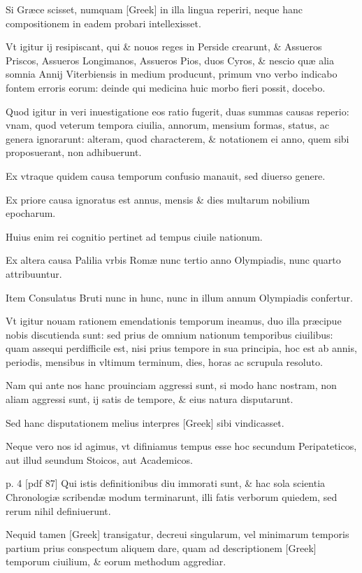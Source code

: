 Si Græce scisset, numquam \textgreek{[Greek]} in illa
lingua reperiri, neque hanc compositionem in eadem probari intellexisset.

Vt igitur ij resipiscant, qui \& nouos reges in Perside crearunt,
\& Assueros Priscos, Assueros Longimanos, Assueros Pios, duos Cyros,
\& nescio quæ alia somnia Annij Viterbiensis in medium producunt,
primum vno verbo indicabo fontem erroris eorum: deinde qui medicina
huic morbo fieri possit, docebo.

Quod igitur in veri inuestigatione
 eos ratio fugerit, duas summas causas reperio: vnam, quod veterum
tempora ciuilia, annorum, mensium formas, status, ac genera ignorarunt:
alteram, quod characterem, \& notationem ei anno, quem sibi
proposuerant, non adhibuerunt.

Ex vtraque quidem causa temporum
confusio manauit, sed diuerso genere.

Ex priore causa ignoratus est
annus, mensis \& dies multarum nobilium epocharum.

Huius enim
rei cognitio pertinet ad tempus ciuile nationum.

Ex altera causa Palilia
vrbis Romæ nunc tertio anno Olympiadis, nunc quarto attribuuntur.

Item Consulatus Bruti nunc in hunc, nunc in illum annum
Olympiadis confertur.

Vt igitur nouam rationem emendationis temporum
ineamus, duo illa præcipue nobis discutienda sunt: sed prius
de omnium nationum temporibus ciuilibus: quam assequi perdifficile
est, nisi prius tempore in sua principia, hoc est ab annis, periodis,
mensibus in vltimum terminum, dies, horas ac scrupula resoluto.

Nam qui ante nos hanc prouinciam aggressi sunt, si modo hanc nostram,
non aliam aggressi sunt, ij satis de tempore, \& eius natura
disputarunt.

Sed hanc disputationem melius interpres \textgreek{[Greek]}
sibi vindicasset.

Neque vero nos id agimus, vt difiniamus
tempus esse hoc secundum Peripateticos, aut illud seundum Stoicos,
aut Academicos.

%

p. 4 [pdf 87]
%
Qui istis definitionibus diu immorati sunt, \& hac
sola scientia Chronologiæ scribendæ modum terminarunt, illi fatis 
verborum quiedem, sed rerum nihil definiuerunt.

Nequid tamen
\textgreek{[Greek]} transigatur, decreui singularum, vel minimarum temporis
partium prius conspectum aliquem dare, quam ad descriptionem
\textgreek{[Greek]} temporum ciuilium, \& eorum methodum aggrediar.


